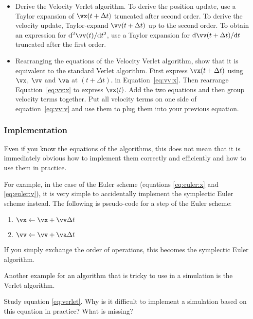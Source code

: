 \begin{task}[3]
  \begin{itemize} 
  \item Derive the Velocity Verlet algorithm. To derive the position
    update, use a Taylor expansion of $\vx(t+\Delta t)$ truncated
    after second order. To derive the velocity update, Taylor-expand
    $\vv(t+\Delta t)$ up to the second order. To obtain an expression
    for $\mathrm{d}^2\vv(t)/\mathrm{d} t^2$, use a Taylor expansion for
    $\mathrm{d} \vv(t+\Delta t)/\mathrm{d} t$ truncated after the first
    order.
  \item Rearranging the equations of the Velocity Verlet algorithm,
    show that it is equivalent to the standard Verlet algorithm.
    First express $\vx(t+\Delta t)$ using $\vx$, $\vv$ and $\va$ at
    $(t+\Delta t)$.  in Equation~\eqref{eq:vv:x}. Then rearrange
    Equation~\eqref{eq:vv:x} to express $\vx(t)$. Add the two equations
    and then group velocity terms together.  Put all velocity terms on
    one side of equation~\eqref{eq:vv:v} and use them to plug them into
    your previous equation.
  \end{itemize}
\end{task}

\subsubsection{Implementation}

Even if you know the equations of the algorithms, this does not mean
that it is immediately obvious how to implement them correctly and
efficiently and how to use them in practice.

For example, in the case of the Euler scheme (equations
\eqref{eq:euler:x} and \eqref{eq:euler:v}), it is very simple to
accidentally implement the symplectic Euler scheme instead.  The
following is pseudo-code for a step of the Euler scheme:
\begin{enumerate}
\item $\vx \leftarrow \vx + \vv \Delta t$
\item $\vv \leftarrow \vv + \va \Delta t$
\end{enumerate}
If you simply exchange the order of operations, this becomes the
symplectic Euler algorithm.

Another example for an algorithm that is tricky to use in a simulation
is the Verlet algorithm.
\begin{task}[1]
  Study equation \eqref{eq:verlet}. Why is it difficult to implement a
  simulation based on this equation in practice? What is missing?
\end{task}

